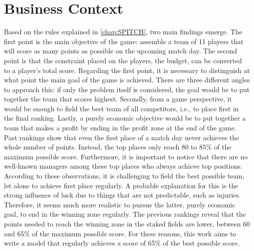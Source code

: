 \section{Business Context}

\label{chap:business_context}

Based on the rules explained in \autoref{chap:SPITCH}, two main findings emerge. The first point is the main objective of the game: assemble a team of 11 players that will score as many points as possible on the upcoming match day. The second point is that the constraint placed on the players, the budget, can be converted to a player's total score. Regarding the first point, it is necessary to distinguish at what point the main goal of the game is achieved. There are three different angles to approach this: if only the problem itself is considered, the goal would be to put together the team that scores highest. Secondly, from a game perspective, it would be enough to field the best team of all competitors, i.e., to place first in the final ranking. Lastly, a purely economic objective would be to put together a team that makes a profit by ending in the profit zone at the end of the game. Past rankings show that even the first place of a match day never achieves the whole number of points. Instead, the top places only reach 80 to 85\% of the maximum possible score. Furthermore, it is important to notice that there are no well-known managers among these top places who always achieve top positions. According to these observations, it is challenging to field the best possible team, let alone to achieve first place regularly. A probable explanation for this is the strong influence of luck due to things that are not predictable, such as injuries. Therefore, it seems much more realistic to pursue the latter, purely economic goal, to end in the winning zone regularly. The previous rankings reveal that the points needed to reach the winning zone in the staked fields are lower, between 60 and 65\% of the maximum possible score. For these reasons, this work aims to write a model that regularly achieves a score of 65\% of the best possible score.

